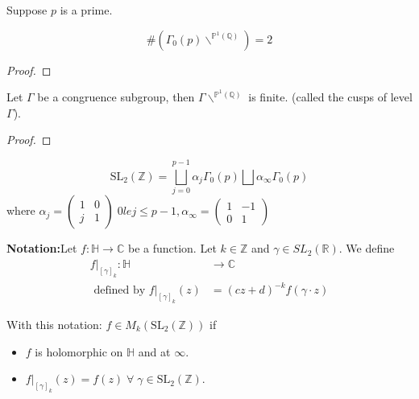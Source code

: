 \documentclass[oneside, 12pt, ]{scrbook}
\newcommand{\CC}{\mathbb C}
\newcommand{\QQ}{\mathbb Q}
\newcommand{\RR}{\mathbb R}
\newcommand{\ZZ}{\mathbb Z}
\newcommand{\PP}{\mathbb{P}}
\newcommand{\SL}{\mathrm{SL}}
\theoremstyle{theorem}
\begin{document}
Suppose $p$ is a prime. 
\begin{proposition}
$$\# \left( \Gamma_{0}(p)\backslash^{\PP^1(\QQ)} \right)=2$$
\end{proposition}

\begin{proof}

\end{proof}

\begin{proposition}
Let $\Gamma$ be a congruence subgroup, then $\Gamma\backslash^{\PP^1 (\QQ)}$ is finite. (called the cusps of level $\Gamma$). 
\end{proposition}

\begin{proof}

\end{proof}

\begin{exercise}
$$\SL_{2}(\ZZ) = \bigsqcup_{j=0}^{p-1} \alpha_{j} \Gamma_{0}(p) \bigsqcup \alpha_{\infty} \Gamma_{0}(p)$$ where $\alpha_{j} = \begin{pmatrix}
1 & 0 \\ j & 1
\end{pmatrix}\; 0 
le j \le p-1 ,  \alpha_{\infty} = \begin{pmatrix}
1 & -1 \\ 0 & 1
\end{pmatrix}$
\end{exercise}

\textbf{Notation:}Let $f: \mathbb{H} \rightarrow \CC$ be a function. Let $k \in \ZZ$ and $\gamma \in SL_{2}(\RR)$. We define 
\begin{align*}
f|_{[\gamma]_{k}} : \mathbb{H} &\rightarrow \CC \\
\text{ defined by } f|_{[\gamma]_{k}}(z) &= (cz+d)^{-k} f(\gamma \cdot z)
\end{align*}

With this notation: $f \in M_{k}(\SL_{2}(\ZZ))$ if 
\begin{itemize}
\item $f$ is holomorphic on $\mathbb{H}$ and at $\infty$.
\item $f|_{[\gamma]_{k}}(z) = f(z) \; \forall \; \gamma \in \SL_{2}(\ZZ)$. 
\end{itemize}
\end{document}
